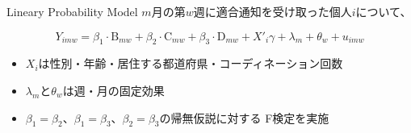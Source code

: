 \documentclass[
      aspectratio=169,
        12pt,
    ]{beamer}
\providecommand{\tightlist}{%
  \setlength{\itemsep}{0pt}\setlength{\parskip}{0pt}}
\begin{document}
\begin{frame}{Lineary Probability Model}
\protect\hypertarget{lineary-probability-model}{}
\(m\)月の第\(w\)週に適合通知を受け取った個人\(i\)について、

\[
  Y_{imw} =
  \beta_1 \cdot \text{B}_{mw} + \beta_2 \cdot \text{C}_{mw}
  + \beta_3 \cdot \text{D}_{mw}
  + X'_i \gamma + \lambda_m + \theta_w + u_{imw}
\]

\begin{itemize}
\tightlist
\item
  \(X_i\)は性別・年齢・居住する都道府県・コーディネーション回数
\item
  \(\lambda_m\)と\(\theta_w\)は週・月の固定効果
\item
  \(\beta_1 = \beta_2\)、\(\beta_1 = \beta_3\)、\(\beta_2 = \beta_3\)の帰無仮説に対する
  F検定を実施
\end{itemize}
\end{frame}
\end{document}
